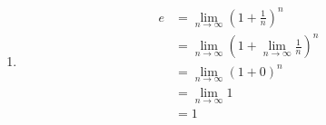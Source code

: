\begin{enumerate}
	\item
		\begin{align}
				e &= \lim_{n \rightarrow \infty} \left( 1 + \frac{1}{n} \right)^{n} \\
				&= \lim_{n \rightarrow \infty} \left( 1 + \lim_{n \rightarrow \infty}\frac{1}{n} \right)^{n} \label{cv4:chyba_c_here} \\
				&= \lim_{n \rightarrow \infty} \left( 1 + 0 \right)^{n} \\
				&= \lim_{n \rightarrow \infty} 1 \\
				&= 1
			\label{cv4:chyba_c}
		\end{align}


\end{enumerate}

